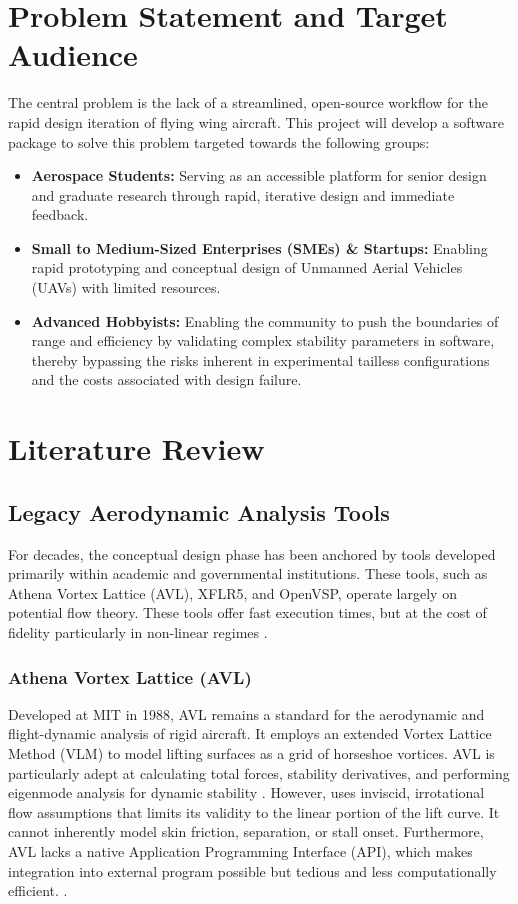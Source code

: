 \documentclass[12pt]{article}
\begin{document}
\section{Problem Statement and Target Audience}
The central problem is the lack of a streamlined, open-source workflow for the rapid design iteration of flying wing aircraft. This project will develop a software package to solve this problem targeted towards the following groups:
\begin{itemize}
    \item \textbf{Aerospace Students:} Serving as an accessible platform for senior design and graduate research through rapid, iterative design and immediate feedback.
    \item \textbf{Small to Medium-Sized Enterprises (SMEs) \& Startups:} Enabling rapid prototyping and conceptual design of Unmanned Aerial Vehicles (UAVs) with limited resources.
    \item \textbf{Advanced Hobbyists:} Enabling the community to push the boundaries of range and efficiency by validating complex stability parameters in software, thereby bypassing the risks inherent in experimental tailless configurations and the costs associated with design failure.
\end{itemize}

\pagebreak

\section{Literature Review}

\subsection{Legacy Aerodynamic Analysis Tools} For decades, the conceptual design phase has been anchored by tools developed primarily within academic and governmental institutions. These tools, such as Athena Vortex Lattice (AVL), XFLR5, and OpenVSP, operate largely on potential flow theory. These tools offer fast execution times, but at the cost of fidelity particularly in non-linear regimes \cite{Szabo2022}.

\subsubsection{Athena Vortex Lattice (AVL)} Developed at MIT in 1988, AVL remains a standard for the aerodynamic and flight-dynamic analysis of rigid aircraft. It employs an extended Vortex Lattice Method (VLM) to model lifting surfaces as a grid of horseshoe vortices. AVL is particularly adept at calculating total forces, stability derivatives, and performing eigenmode analysis for dynamic stability \cite{Drela1988}. However, uses inviscid, irrotational flow assumptions that limits its validity to the linear portion of the lift curve. It cannot inherently model skin friction, separation, or stall onset. Furthermore, AVL lacks a native Application Programming Interface (API), which makes integration into external program possible but tedious and less computationally efficient. \cite{Szabo2022}.
\end{document}
